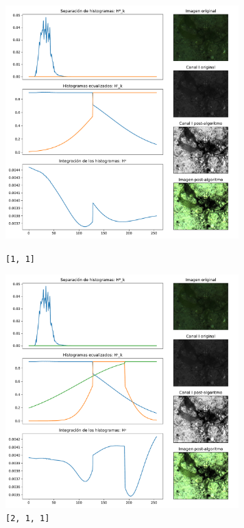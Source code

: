 \begin{figure}[H]
\begin{minipage}[c]{0.48\linewidth}
  \includegraphics[height=9cm]{imgs/1906bxx-11.pdf}
  \caption{\texttt{[1, 1]}}
\end{minipage}
\hfill
\begin{minipage}[c]{0.48\linewidth}
  \includegraphics[height=9cm]{imgs/1906bxx-211.pdf}
  \caption{\texttt{[2, 1, 1]}}
\end{minipage}%
\end{figure}

